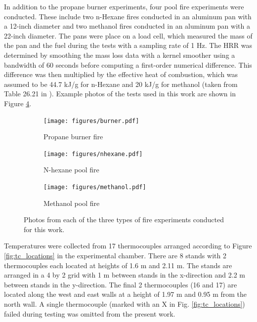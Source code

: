 \documentclass{article}
\begin{document}
In addition to the propane burner experiments, four pool fire experiments were conducted. These include two n-Hexane fires conducted in an aluminum pan with a 12-inch diameter and two methanol fires conducted in an aluminum pan with a 22-inch diameter. The pans were place on a load cell, which measured the mass of the pan and the fuel during the tests with a sampling rate of 1 Hz. The HRR was determined by smoothing the mass loss data with a kernel smoother using a bandwidth of 60 seconds before computing a first-order numerical difference. This difference was then multiplied by the effective heat of combustion, which was assumed to be 44.7 kJ/g for n-Hexane and 20 kJ/g for methanol (taken from Table 26.21 in \cite{babrauskas2016heat}). Example photos of the tests used in this work are shown in Figure \ref{fig:experiment_photos}.


\begin{figure}[htbp]
  \centering
  \begin{subfigure}[t]{.301\textwidth}
      \centering
      \texttt{[image: figures/burner.pdf]}
      \caption{Propane burner fire}
      \label{fig:propane_image}
  \end{subfigure}
  \begin{subfigure}[t]{.3\textwidth}
      \centering
      \texttt{[image: figures/nhexane.pdf]}
      \caption{N-hexane pool fire}
      \label{fig:nhexane_image}
  \end{subfigure}
  \begin{subfigure}[t]{.3\textwidth}
      \centering
      \texttt{[image: figures/methanol.pdf]}
      \caption{Methanol pool fire}
      \label{fig:methanol_image}
  \end{subfigure}
  \caption{Photos from each of the three types of fire experiments conducted for this work.}
    \label{fig:experiment_photos}
\end{figure}

Temperatures were collected from 17 thermocouples arranged according to Figure \ref{fig:tc_locations} in the experimental chamber. There are 8 stands with 2 thermocouples each located at heights of 1.6 m and 2.11 m. The stands are arranged in a 4 by 2 grid with 1 m between stands in the x-direction and 2.2 m between stands in the y-direction. The final 2 thermocouples (16 and 17) are located along the west and east walls at a height of 1.97 m and 0.95 m from the north wall. A single thermocouple (marked with an X in Fig. \ref{fig:tc_locations}) failed during testing was omitted from the present work.
\end{document}

